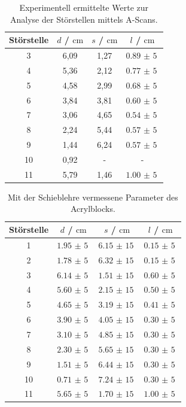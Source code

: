 \begin{table}
  \centering
  \caption{Experimentell ermittelte Werte zur Analyse der Störstellen mittels A-Scans.}
  \label{tab2}
  \begin{tabular}{c c c c  }
    \toprule
    Störstelle & $d$ / $\si{\cm}$ & $s$ / $\si{\cm}$ & $l$ / $\si{\cm}$ \\
    \midrule
     3    &   6,09    &   1,27    &   $\SI{0,89(5)}{}$    \\
     4    &   5,36    &   2,12    &   $\SI{0,77(5)}{}$    \\
     5    &   4,58    &   2,99    &   $\SI{0,68(5)}{}$    \\
     6    &   3,84    &   3,81    &   $\SI{0,60(5)}{}$    \\
     7    &   3,06    &   4,65    &   $\SI{0,54(5)}{}$    \\
     8    &   2,24    &   5,44    &   $\SI{0,57(5)}{}$    \\
     9    &   1,44    &   6,24    &   $\SI{0,57(5)}{}$    \\
    10    &   0,92    &   -       &   -                   \\
    11    &   5,79    &   1,46    &   $\SI{1,00(5)}{}$    \\
    \bottomrule
  \end{tabular}
\end{table}
\FloatBarrier

\begin{table}
  \centering
  \caption{Mit der Schieblehre vermessene Parameter des Acrylblocks.}
  \label{tab3}
  \begin{tabular}{ c c c c }
    \toprule
    Störstelle & $d$ / $\si{\cm}$ & $s$ / $\si{\cm}$ & $l$ / $\si{\cm}$ \\
    \midrule
 1    &   $\SI{1,95(5)}{}$    &    $\SI{6,15(15)}{}$       &   $\SI{0,15(5)}{}$     \\
 2    &   $\SI{1,78(5)}{}$    &    $\SI{6,32(15)}{}$       &   $\SI{0,15(5)}{}$     \\
 3    &   $\SI{6,14(5)}{}$    &    $\SI{1,51(15)}{}$       &   $\SI{0,60(5)}{}$     \\
 4    &   $\SI{5,60(5)}{}$    &    $\SI{2,15(15)}{}$       &   $\SI{0,50(5)}{}$     \\
 5    &   $\SI{4,65(5)}{}$    &    $\SI{3,19(15)}{}$       &   $\SI{0,41(5)}{}$     \\
 6    &   $\SI{3,90(5)}{}$    &    $\SI{4,05(15)}{}$       &   $\SI{0,30(5)}{}$     \\
 7    &   $\SI{3,10(5)}{}$    &    $\SI{4,85(15)}{}$       &   $\SI{0,30(5)}{}$     \\
 8    &   $\SI{2,30(5)}{}$    &    $\SI{5,65(15)}{}$       &   $\SI{0,30(5)}{}$     \\
 9    &   $\SI{1,51(5)}{}$    &    $\SI{6,44(15)}{}$       &   $\SI{0,30(5)}{}$     \\
10    &   $\SI{0,71(5)}{}$    &    $\SI{7,24(15)}{}$       &   $\SI{0,30(5)}{}$     \\
11    &   $\SI{5,65(5)}{}$    &    $\SI{1,70(15)}{}$       &   $\SI{1,00(5)}{}$     \\
  \bottomrule
  \end{tabular}
\end{table}


